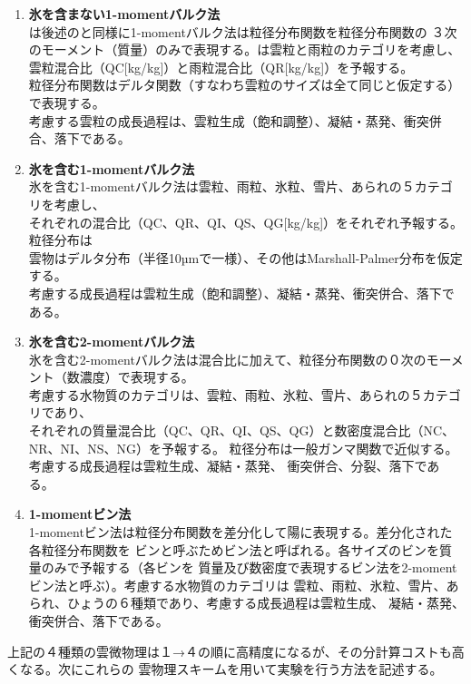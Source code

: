 \begin{enumerate}
\item {\bf 氷を含まない1-momentバルク法\cite{kessler_1969}}\\
\cite{kessler_1969}は後述の\cite{tomita_2008}と同様に1-momentバルク法は粒径分布関数を粒径分布関数の
３次のモーメント（質量）のみで表現する。\cite{kessler_1969}は雲粒と雨粒のカテゴリを考慮し、
雲粒混合比（QC[kg/kg]）と雨粒混合比（QR[kg/kg]）を予報する。\\
粒径分布関数はデルタ関数（すなわち雲粒のサイズは全て同じと仮定する）で表現する。\\
考慮する雲粒の成長過程は、雲粒生成（飽和調整）、凝結・蒸発、衝突併合、落下である。
\item {\bf 氷を含む1-momentバルク法\cite{tomita_2008}}\\
氷を含む1-momentバルク法は雲粒、雨粒、氷粒、雪片、あられの５カテゴリを考慮し、\\
それぞれの混合比（QC、QR、QI、QS、QG[kg/kg]）をそれぞれ予報する。粒径分布は\\
雲物はデルタ分布（半径10µmで一様）、その他はMarshall-Palmer分布を仮定する。\\
考慮する成長過程は雲粒生成（飽和調整）、凝結・蒸発、衝突併合、落下である。
\item {\bf 氷を含む2-momentバルク法\cite{sn_2014}}\\
氷を含む2-momentバルク法は混合比に加えて、粒径分布関数の０次のモーメント（数濃度）で表現する。\\
考慮する水物質のカテゴリは、雲粒、雨粒、氷粒、雪片、あられの５カテゴリであり、\\
それぞれの質量混合比（QC、QR、QI、QS、QG）と数密度混合比（NC、NR、NI、NS、NG）を予報する。
粒径分布は一般ガンマ関数で近似する。考慮する成長過程は雲粒生成、凝結・蒸発、
衝突併合、分裂、落下である。
\item {\bf 1-momentビン法\cite{suzuki_etal_2010}}\\
1-momentビン法は粒径分布関数を差分化して陽に表現する。差分化された各粒径分布関数を
ビンと呼ぶためビン法と呼ばれる。各サイズのビンを質量のみで予報する（各ビンを
質量及び数密度で表現するビン法を2-momentビン法と呼ぶ）。考慮する水物質のカテゴリは
雲粒、雨粒、氷粒、雪片、あられ、ひょうの６種類であり、考慮する成長過程は雲粒生成、
凝結・蒸発、衝突併合、落下である。
\end{enumerate}

上記の４種類の雲微物理は１→４の順に高精度になるが、その分計算コストも高くなる。次にこれらの
雲物理スキームを用いて実験を行う方法を記述する。

